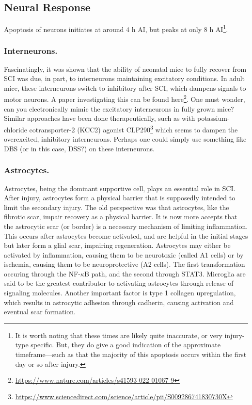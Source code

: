 \subsection{Neural Response}

Apoptosis of neurons initiates at around 4 h AI, but peaks at only 8 h AI\footnote{It is worth noting that these times are likely quite inaccurate, or very injury-type specific. But, they do give a good indication of the approximate timeframe---such as that the majority of this apoptosis occurs within the first day or so after injury.}. 

\subsubsection{Interneurons.}
Fascinatingly, it was shown that the ability of neonatal mice to fully recover from SCI was due, in part, to interneurons maintaining excitatory conditions. In adult mice, these interneurons switch to inhibitory after SCI, which dampens signals to motor neurons. A paper investigating this can be found here\footnote{\url{https://www.nature.com/articles/s41593-022-01067-9}}. One must wonder, can you electronically mimic the excitatory interneurons in fully grown mice? Similar approaches have been done therapeutically, such as with potassium-chloride cotransporter-2 (KCC2) agonist CLP290\footnote{\url{https://www.sciencedirect.com/science/article/pii/S009286741830730X}} which seems to dampen the overexcited, inhibitory interneurons. Perhaps one could simply use something like DBS (or in this case, DSS?) on these interneurons.  

\subsubsection{Astrocytes.}
Astrocytes, being the dominant supportive cell, plays an essential role in SCI. After injury, astrocytes form a physical barrier that is supposedly intended to limit the secondary injury. The old perspective was that astrocytes, like the fibrotic scar, impair recovery as a physical barrier. It is now more accepts that the astrocytic scar (or border) is a necessary mechanism of limiting inflammation. This occurs after astrocytes become activated, and are helpful in the initial stages but later form a glial scar, impairing regeneration. Astrocytes may either be activated by inflammation, causing them to be neurotoxic (called A1 cells) or by ischemia, causing them to be neuroprotective (A2 cells). The first transformation occuring through the NF-$\kappa$B path, and the second through STAT3. Microglia are said to be the greatest contributor to activating astrocytes through release of signaling molecules. Another important factor is type 1 collagen upregulation, which results in astrocytic adhesion through cadherin, causing activation and eventual scar formation.\newline


